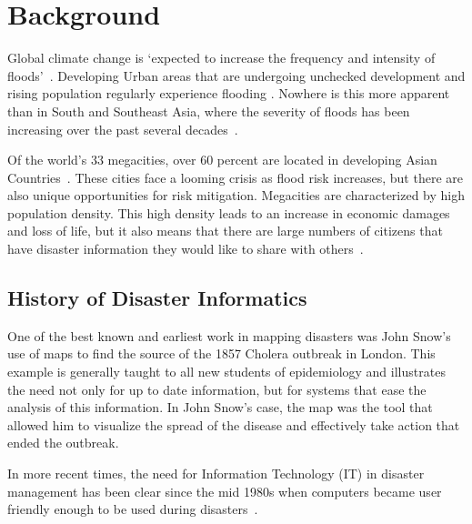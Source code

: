\chapter{Background}

Global climate change is
`expected to increase the frequency and intensity of
floods'~\cite{ahernGlobalHealthImpacts2005}. Developing Urban areas that are
undergoing unchecked development and rising population regularly experience
flooding%
.
Nowhere is this more apparent than in
South and Southeast Asia, where the severity of floods has been increasing over
the past several decades~\cite{tortiFloodsSoutheastAsia2012}.

Of the world's 33 megacities, over 60 percent are located in developing Asian
Countries~\cite{unitednationsdepartmentofeconomicandsocialaffairsWorldCities20162016}.
These cities face a looming crisis as flood risk increases, but there are also
unique opportunities for risk mitigation. Megacities are characterized by high
population density. This high density leads to an increase in economic damages
and loss of life, but it also means that there are large numbers of citizens
that have disaster information they would like to share with
others~\cite{chanFloodRiskAsia2012}.

\section{History of Disaster Informatics} One of the best known and earliest
work in mapping disasters was John Snow's use of maps to find the
source of the 1857 Cholera outbreak in London\cite{rogersJohnSnowData2013}. This
example is generally taught to all new students of epidemiology and illustrates
the need not only for up to date information, but for systems that ease the
analysis of this information. In John Snow's case, the map was the tool that
allowed him to visualize the spread of the disease and effectively take action
that ended the outbreak.

In more recent times, the need for Information Technology (IT) in disaster
management has been clear since the mid 1980s when computers became user
friendly enough to be used during
disasters~\cite{universityTerminalDisastersComputer1986}. 

